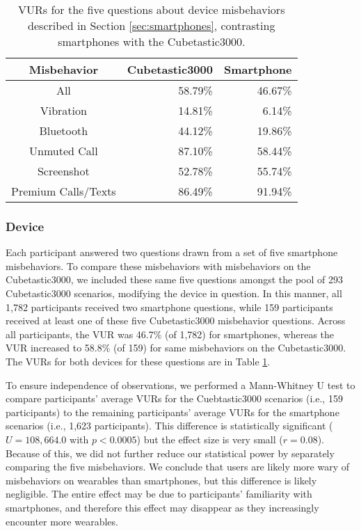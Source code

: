 

\begin{table}[t]
\small
\begin{center}
\begin{tabular}{| c | r | r |}
\hline
 Misbehavior &  Cubetastic3000 & Smartphone \\
 \hline
 \hline
 All & 58.79\% & 46.67\%\\
 \hline
Vibration & 14.81\%  &  6.14\%\\
Bluetooth & 44.12\%  &  19.86\%\\
Unmuted Call & 87.10\%  &  58.44\%\\
Screenshot & 52.78\%  & 55.74\%\\
Premium Calls/Texts & 86.49\%  &  91.94\%\\ 
\hline
\end{tabular}
\caption{VURs for the five questions about device misbehaviors described in Section \ref{sec:smartphones}, contrasting smartphones with the Cubetastic3000.}
\label{deviceVUR}
\end{center}
\end{table}

\subsubsection{Device}
Each participant answered two questions drawn from a set of five smartphone misbehaviors. To compare these misbehaviors with misbehaviors on the Cubetastic3000, we included these same five questions amongst the pool of 293 Cubetastic3000 scenarios, modifying the device in question. In this manner, all 1,782 participants received two smartphone questions, while 159 participants received at least one of these five Cubetastic3000 misbehavior questions. Across all participants, the VUR was 46.7\% (of 1,782) for smartphones, whereas the VUR increased to 58.8\% (of 159) for same misbehaviors on the Cubetastic3000. The VURs for both devices for these questions are in Table \ref{deviceVUR}.

To ensure independence of observations, we performed a Mann-Whitney U test to compare participants' average VURs for the Cuebtastic3000 scenarios (i.e., 159 participants) to the remaining participants' average VURs for the smartphone scenarios (i.e., 1,623 participants). This difference is statistically significant ($U=108,664.0$ with $p<0.0005$) but the effect size is very small ($r=0.08$). Because of this, we did not further reduce our statistical power by separately comparing the five misbehaviors. We conclude that users are likely more wary of misbehaviors on wearables than smartphones, but this difference is likely negligible. The entire effect may be due to participants' familiarity with smartphones, and therefore this effect may disappear as they increasingly encounter more wearables.

